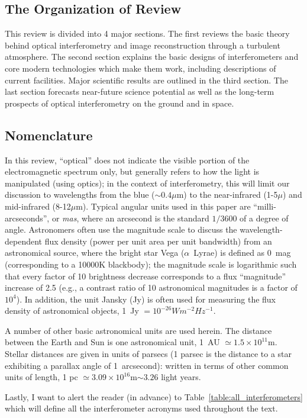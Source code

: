 \documentclass[12pt]{article}
\begin{document}
\subsection{The Organization of Review}
This review is divided into 4 major sections. The first reviews the
basic theory behind optical interferometry and image reconstruction
through a turbulent atmosphere.  The second section explains the basic
designs of interferometers and core modern technologies which make
them work, including descriptions of current facilities.  Major
scientific results are outlined in the third section.  The last
section forecasts near-future science potential as well as the
long-term prospects of optical interferometry on the ground and in
space.

\subsection{Nomenclature}
In this review, ``optical'' does not indicate the visible portion of
the electromagnetic spectrum only, but generally refers to how the
light is manipulated (using optics); in the context of interferometry,
this will limit our discussion to wavelengths from the blue
($\sim0.4\mu$m) to the near-infrared (1-5$\mu$) and mid-infrared
(8-12$\mu$m).  Typical angular units used in this paper are
``milli-arcseconds'', or {\em mas}, where an arcsecond is the standard
$1/3600$ of a degree of angle.  Astronomers often use the magnitude
scale to discuss the wavelength-dependent flux density (power per unit
area per unit bandwidth) from an astronomical source, where the bright
star Vega ($\alpha$~Lyrae) is defined as 0~mag (corresponding to a
10000K blackbody); the magnitude scale is logarithmic such that every
factor of 10 brightness decrease corresponds to a flux ``magnitude''
increase of 2.5 (e.g., a contrast ratio of 10 astronomical magnitudes
is a factor of $10^4$).  In addition, the unit Jansky (Jy) is often
used for measuring the flux density of astronomical objects, 1~Jy
$=10^{-26} W m^{-2} Hz^{-1}$.

A number of other basic astronomical units are used herein.  The
distance between the Earth and Sun is one astronomical unit, 1~AU
$\simeq 1.5 \times 10^{11}$m.  Stellar distances are given in units of
parsecs (1 parsec is the distance to a star exhibiting a parallax
angle of 1~arcsecond): written in terms of other common units of
length, 1 pc $\simeq 3.09\times 10^{16}$m$\sim 3.26$ light years.

Lastly, I want to alert the reader (in advance) 
to Table~\ref{table:all_interferometers}
which will define all the interferometer acronyms used throughout the text.
\end{document}
